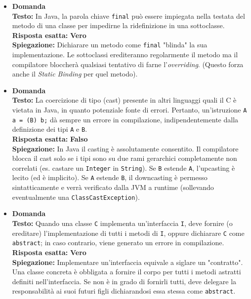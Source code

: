 \documentclass[12pt, a4paper]{article}
\begin{document}
\begin{itemize}
    \item {}\textbf{Domanda \thedomanda} \\
    \textbf{Testo:} In Java, la parola chiave \texttt{final} può essere impiegata nella testata del metodo di una classe per impedirne la ridefinizione in una sottoclasse. \\
    \textbf{Risposta esatta:} \textbf{Vero} \\
    \textbf{Spiegazione:} Dichiarare un metodo come \texttt{final} "blinda" la sua implementazione. Le sottoclassi erediteranno regolarmente il metodo ma il compilatore bloccherà qualsiasi tentativo di farne l'\textit{overriding}. (Questo forza anche il \textit{Static Binding} per quel metodo).
    \vspace{0.3cm}

    \item {}\textbf{Domanda \thedomanda} \\
    \textbf{Testo:} La coercizione di tipo (cast) presente in altri linguaggi quali il C è vietata in Java, in quanto potenziale fonte di errori. Pertanto, un'istruzione \texttt{A a = (B) b;} dà sempre un errore in compilazione, indipendentemente dalla definizione dei tipi \texttt{A} e \texttt{B}. \\
    \textbf{Risposta esatta:} \textbf{Falso} \\
    \textbf{Spiegazione:} In Java il casting è assolutamente consentito. Il compilatore blocca il cast solo se i tipi sono su due rami gerarchici completamente non correlati (es. castare un \texttt{Integer} in \texttt{String}). Se \texttt{B} estende \texttt{A}, l'upcasting è lecito (ed è implicito). Se \texttt{A} estende \texttt{B}, il downcasting è permesso sintatticamente e verrà verificato dalla JVM a runtime (sollevando eventualmente una \texttt{ClassCastException}).
    \vspace{0.3cm}

    \item {}\textbf{Domanda \thedomanda} \\
    \textbf{Testo:} Quando una classe \texttt{C} implementa un'interfaccia \texttt{I}, deve fornire (o ereditare) l'implementazione di tutti i metodi di \texttt{I}, oppure dichiarare \texttt{C} come \texttt{abstract}; in caso contrario, viene generato un errore in compilazione. \\
    \textbf{Risposta esatta:} \textbf{Vero} \\
    \textbf{Spiegazione:} Implementare un'interfaccia equivale a siglare un "contratto". Una classe concreta è obbligata a fornire il corpo per tutti i metodi astratti definiti nell'interfaccia. Se non è in grado di fornirli tutti, deve delegare la responsabilità ai suoi futuri figli dichiarandosi essa stessa come \texttt{abstract}.
    \vspace{0.3cm}


\end{itemize}
\end{document}
